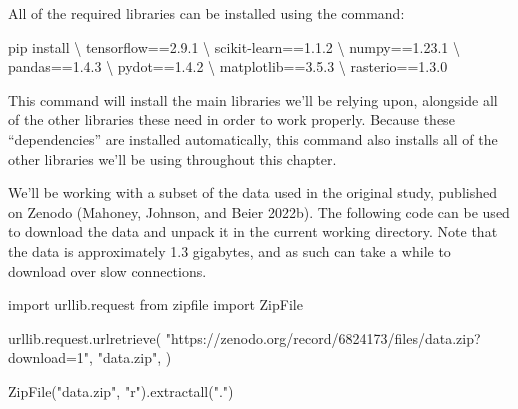 \documentclass[
  letterpaper,
  DIV=11,
  numbers=noendperiod]{scrartcl}
\newenvironment{Shaded}{\begin{snugshade}}{\end{snugshade}}
\newcommand{\FloatTok}[1]{\textcolor[rgb]{0.68,0.00,0.00}{#1}}
\newcommand{\ImportTok}[1]{\textcolor[rgb]{0.00,0.46,0.62}{#1}}
\newcommand{\NormalTok}[1]{\textcolor[rgb]{0.00,0.23,0.31}{#1}}
\newcommand{\OperatorTok}[1]{\textcolor[rgb]{0.37,0.37,0.37}{#1}}
\newcommand{\StringTok}[1]{\textcolor[rgb]{0.13,0.47,0.30}{#1}}
\begin{document}
All of the required libraries can be installed using the command:

\begin{Shaded}
\begin{Highlighting}[]
\NormalTok{pip install }\OperatorTok{\textbackslash{}}
\NormalTok{  tensorflow}\OperatorTok{==}\FloatTok{2.9.1} \OperatorTok{\textbackslash{}}
\NormalTok{  scikit}\OperatorTok{{-}}\NormalTok{learn}\OperatorTok{==}\FloatTok{1.1.2} \OperatorTok{\textbackslash{}}
\NormalTok{  numpy}\OperatorTok{==}\FloatTok{1.23.1} \OperatorTok{\textbackslash{}}
\NormalTok{  pandas}\OperatorTok{==}\FloatTok{1.4.3} \OperatorTok{\textbackslash{}}
\NormalTok{  pydot}\OperatorTok{==}\FloatTok{1.4.2} \OperatorTok{\textbackslash{}}
\NormalTok{  matplotlib}\OperatorTok{==}\FloatTok{3.5.3} \OperatorTok{\textbackslash{}}
\NormalTok{  rasterio}\OperatorTok{==}\FloatTok{1.3.0}
\end{Highlighting}
\end{Shaded}

This command will install the main libraries we'll be relying upon,
alongside all of the other libraries these need in order to work
properly. Because these ``dependencies'' are installed automatically,
this command also installs all of the other libraries we'll be using
throughout this chapter.

We'll be working with a subset of the data used in the original study,
published on Zenodo (Mahoney, Johnson, and Beier 2022b). The following
code can be used to download the data and unpack it in the current
working directory. Note that the data is approximately 1.3 gigabytes,
and as such can take a while to download over slow connections.

\begin{Shaded}
\begin{Highlighting}[]
\ImportTok{import}\NormalTok{ urllib.request}
\ImportTok{from}\NormalTok{ zipfile }\ImportTok{import}\NormalTok{ ZipFile}

\NormalTok{urllib.request.urlretrieve(}
    \StringTok{"https://zenodo.org/record/6824173/files/data.zip?download=1"}\NormalTok{,}
    \StringTok{"data.zip"}\NormalTok{,}
\NormalTok{)}

\NormalTok{ZipFile(}\StringTok{"data.zip"}\NormalTok{, }\StringTok{"r"}\NormalTok{).extractall(}\StringTok{"."}\NormalTok{)}
\end{Highlighting}
\end{Shaded}
\end{document}
